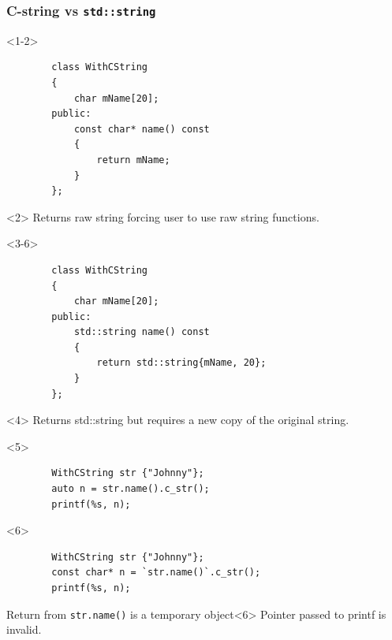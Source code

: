 \documentclass{beamer}
\begin{document}
\begin{frame}[fragile]
\frametitle{C-string vs \texttt{std::string}}
    \begin{onlyenv}<1-2>
    \begin{lstlisting}
        class WithCString
        {
            char mName[20];
        public:
            const char* name() const
            {
                return mName;
            }
        };
    \end{lstlisting}

    \begin{alertblock}{}<2>
        Returns raw string forcing user to use raw string functions.
    \end{alertblock}

    \end{onlyenv}
    
    \begin{onlyenv}<3-6>
    \begin{lstlisting}
        class WithCString
        {
            char mName[20];
        public:
            std::string name() const
            {
                return std::string{mName, 20};
            }
        };
    \end{lstlisting}

    \begin{alertblock}{}<4>
        Returns std::string but requires a new copy of the original string.
    \end{alertblock}
    \end{onlyenv}

    \hrulefill
    \begin{onlyenv}<5>
    \begin{lstlisting}
        WithCString str {"Johnny"};
        auto n = str.name().c_str();
        printf(%s, n);
    \end{lstlisting}
    \end{onlyenv}

    \begin{onlyenv}<6>
    \begin{lstlisting}
        WithCString str {"Johnny"};
        const char* n = `str.name()`.c_str();
        printf(%s, n);
    \end{lstlisting}

    \begin{alertblock}{Return from \texttt{str.name()} is a temporary object}<6>
        Pointer passed to printf is invalid.
    \end{alertblock}
    \end{onlyenv}


\end{frame}
\end{document}
